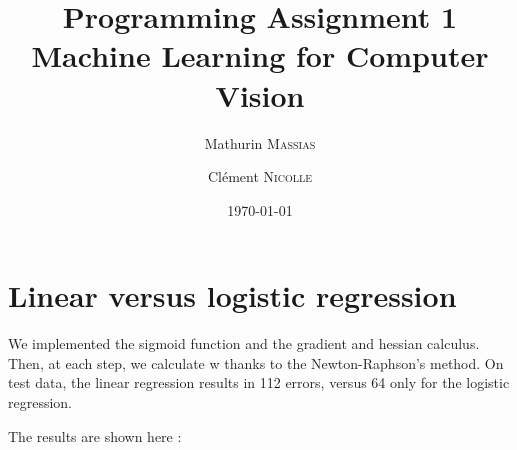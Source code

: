 \documentclass[a4paper, 12pt]{article}
\begin{document}
 
\title{Programming Assignment 1 \\ Machine Learning for Computer Vision}
\author{Mathurin \textsc{Massias} \and Clément \textsc{Nicolle}}
\date{\today} 
 
\maketitle

\section{Linear versus logistic regression}

We implemented the sigmoid function and the gradient and hessian calculus. Then, at each step, we calculate w thanks to the Newton-Raphson's method. On test data, the linear regression results in 112 errors, versus 64 only for the logistic regression.

The results are shown here :
\end{document}
